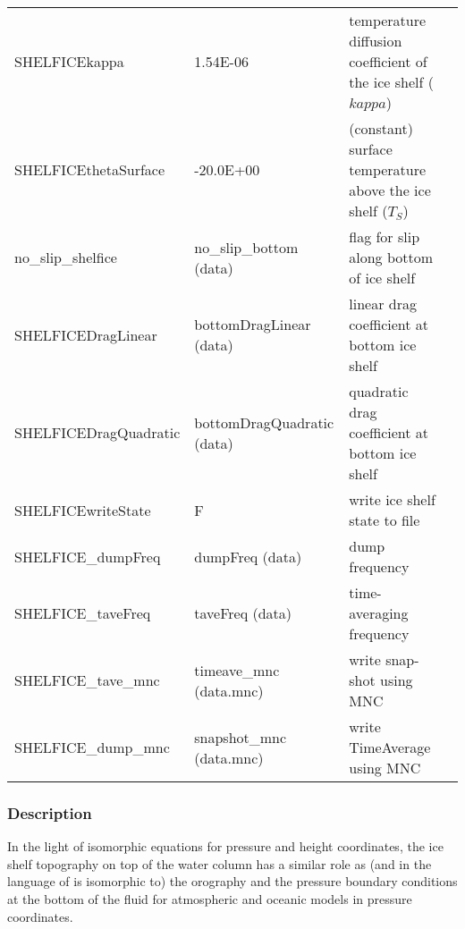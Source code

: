 \begin{table}[h!]
{\begin{tabular}{|lp{4cm}p{4cm}c|}
      SHELFICEkappa            &   1.54E-06
      &   temperature diffusion coefficient of the ice shelf ($kappa$)
      &  %
      \\
      SHELFICEthetaSurface     &  -20.0E+00
      &   (constant) surface temperature above the ice shelf ($T_{S}$)
      &  %
      \\
      no\_slip\_shelfice       & no\_slip\_bottom (data)
      &   flag for slip along bottom of ice shelf
      &  %
      \\
      SHELFICEDragLinear       & bottomDragLinear (data)
      &   linear drag coefficient at bottom ice shelf
      &  %
      \\
      SHELFICEDragQuadratic    & bottomDragQuadratic (data)
      &   quadratic drag coefficient at bottom ice shelf
      &  %
      \\
      SHELFICEwriteState       & F
      &   write ice shelf state to file 
      &  %
      \\
      SHELFICE\_dumpFreq       & dumpFreq (data)
      &   dump frequency
      &  %
      \\
      SHELFICE\_taveFreq       & taveFreq (data)
      &   time-averaging frequency 
      &  %
      \\
      SHELFICE\_tave\_mnc      & timeave\_mnc (data.mnc)
      &   write snap-shot   using MNC 
      &  %
      \\
      SHELFICE\_dump\_mnc      & snapshot\_mnc (data.mnc)
      &   write TimeAverage using MNC 
      &  %
      \\
\hline
\end{tabular}
}
\end{table}



\subsubsection{Description
\label{sec:pkg:shelfice:descr}}

In the light of isomorphic equations for pressure and height
coordinates, the ice shelf topography on top of the water column has a
similar role as (and in the language of \citet{marshall:04} is
isomorphic to) the orography and the pressure boundary conditions at
the bottom of the fluid for atmospheric and oceanic models in pressure
coordinates.
%

